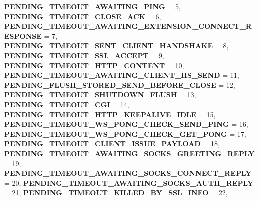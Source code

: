 \begin{DoxyCompactItemize}
{\bfseries P\+E\+N\+D\+I\+N\+G\+\_\+\+T\+I\+M\+E\+O\+U\+T\+\_\+\+A\+W\+A\+I\+T\+I\+N\+G\+\_\+\+P\+I\+NG} = 5, 
\newline
{\bfseries P\+E\+N\+D\+I\+N\+G\+\_\+\+T\+I\+M\+E\+O\+U\+T\+\_\+\+C\+L\+O\+S\+E\+\_\+\+A\+CK} = 6, 
{\bfseries P\+E\+N\+D\+I\+N\+G\+\_\+\+T\+I\+M\+E\+O\+U\+T\+\_\+\+A\+W\+A\+I\+T\+I\+N\+G\+\_\+\+E\+X\+T\+E\+N\+S\+I\+O\+N\+\_\+\+C\+O\+N\+N\+E\+C\+T\+\_\+\+R\+E\+S\+P\+O\+N\+SE} = 7, 
{\bfseries P\+E\+N\+D\+I\+N\+G\+\_\+\+T\+I\+M\+E\+O\+U\+T\+\_\+\+S\+E\+N\+T\+\_\+\+C\+L\+I\+E\+N\+T\+\_\+\+H\+A\+N\+D\+S\+H\+A\+KE} = 8, 
{\bfseries P\+E\+N\+D\+I\+N\+G\+\_\+\+T\+I\+M\+E\+O\+U\+T\+\_\+\+S\+S\+L\+\_\+\+A\+C\+C\+E\+PT} = 9, 
\newline
{\bfseries P\+E\+N\+D\+I\+N\+G\+\_\+\+T\+I\+M\+E\+O\+U\+T\+\_\+\+H\+T\+T\+P\+\_\+\+C\+O\+N\+T\+E\+NT} = 10, 
{\bfseries P\+E\+N\+D\+I\+N\+G\+\_\+\+T\+I\+M\+E\+O\+U\+T\+\_\+\+A\+W\+A\+I\+T\+I\+N\+G\+\_\+\+C\+L\+I\+E\+N\+T\+\_\+\+H\+S\+\_\+\+S\+E\+ND} = 11, 
{\bfseries P\+E\+N\+D\+I\+N\+G\+\_\+\+F\+L\+U\+S\+H\+\_\+\+S\+T\+O\+R\+E\+D\+\_\+\+S\+E\+N\+D\+\_\+\+B\+E\+F\+O\+R\+E\+\_\+\+C\+L\+O\+SE} = 12, 
{\bfseries P\+E\+N\+D\+I\+N\+G\+\_\+\+T\+I\+M\+E\+O\+U\+T\+\_\+\+S\+H\+U\+T\+D\+O\+W\+N\+\_\+\+F\+L\+U\+SH} = 13, 
\newline
{\bfseries P\+E\+N\+D\+I\+N\+G\+\_\+\+T\+I\+M\+E\+O\+U\+T\+\_\+\+C\+GI} = 14, 
{\bfseries P\+E\+N\+D\+I\+N\+G\+\_\+\+T\+I\+M\+E\+O\+U\+T\+\_\+\+H\+T\+T\+P\+\_\+\+K\+E\+E\+P\+A\+L\+I\+V\+E\+\_\+\+I\+D\+LE} = 15, 
{\bfseries P\+E\+N\+D\+I\+N\+G\+\_\+\+T\+I\+M\+E\+O\+U\+T\+\_\+\+W\+S\+\_\+\+P\+O\+N\+G\+\_\+\+C\+H\+E\+C\+K\+\_\+\+S\+E\+N\+D\+\_\+\+P\+I\+NG} = 16, 
{\bfseries P\+E\+N\+D\+I\+N\+G\+\_\+\+T\+I\+M\+E\+O\+U\+T\+\_\+\+W\+S\+\_\+\+P\+O\+N\+G\+\_\+\+C\+H\+E\+C\+K\+\_\+\+G\+E\+T\+\_\+\+P\+O\+NG} = 17, 
\newline
{\bfseries P\+E\+N\+D\+I\+N\+G\+\_\+\+T\+I\+M\+E\+O\+U\+T\+\_\+\+C\+L\+I\+E\+N\+T\+\_\+\+I\+S\+S\+U\+E\+\_\+\+P\+A\+Y\+L\+O\+AD} = 18, 
{\bfseries P\+E\+N\+D\+I\+N\+G\+\_\+\+T\+I\+M\+E\+O\+U\+T\+\_\+\+A\+W\+A\+I\+T\+I\+N\+G\+\_\+\+S\+O\+C\+K\+S\+\_\+\+G\+R\+E\+E\+T\+I\+N\+G\+\_\+\+R\+E\+P\+LY} = 19, 
{\bfseries P\+E\+N\+D\+I\+N\+G\+\_\+\+T\+I\+M\+E\+O\+U\+T\+\_\+\+A\+W\+A\+I\+T\+I\+N\+G\+\_\+\+S\+O\+C\+K\+S\+\_\+\+C\+O\+N\+N\+E\+C\+T\+\_\+\+R\+E\+P\+LY} = 20, 
{\bfseries P\+E\+N\+D\+I\+N\+G\+\_\+\+T\+I\+M\+E\+O\+U\+T\+\_\+\+A\+W\+A\+I\+T\+I\+N\+G\+\_\+\+S\+O\+C\+K\+S\+\_\+\+A\+U\+T\+H\+\_\+\+R\+E\+P\+LY} = 21, 
\newline
{\bfseries P\+E\+N\+D\+I\+N\+G\+\_\+\+T\+I\+M\+E\+O\+U\+T\+\_\+\+K\+I\+L\+L\+E\+D\+\_\+\+B\+Y\+\_\+\+S\+S\+L\+\_\+\+I\+N\+FO} = 22, 

\end{DoxyCompactItemize}
